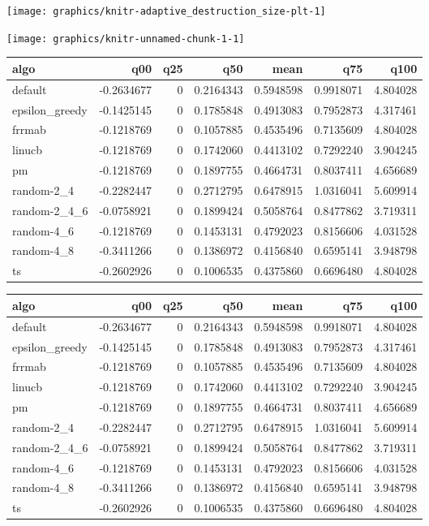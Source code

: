 \documentclass[
]{article}
\begin{document}
\begin{center}\texttt{[image: graphics/knitr-adaptive\_destruction\_size-plt-1]} \end{center}

\begin{center}\texttt{[image: graphics/knitr-unnamed-chunk-1-1]} \end{center}

\begin{longtable}[]{@{}lrrrrrr@{}}
\toprule
algo & q00 & q25 & q50 & mean & q75 & q100 \\
\midrule
\endhead
default & -0.2634677 & 0 & 0.2164343 & 0.5948598 & 0.9918071 &
4.804028 \\
epsilon\_greedy & -0.1425145 & 0 & 0.1785848 & 0.4913083 & 0.7952873 &
4.317461 \\
frrmab & -0.1218769 & 0 & 0.1057885 & 0.4535496 & 0.7135609 &
4.804028 \\
linucb & -0.1218769 & 0 & 0.1742060 & 0.4413102 & 0.7292240 &
3.904245 \\
pm & -0.1218769 & 0 & 0.1897755 & 0.4664731 & 0.8037411 & 4.656689 \\
random-2\_4 & -0.2282447 & 0 & 0.2712795 & 0.6478915 & 1.0316041 &
5.609914 \\
random-2\_4\_6 & -0.0758921 & 0 & 0.1899424 & 0.5058764 & 0.8477862 &
3.719311 \\
random-4\_6 & -0.1218769 & 0 & 0.1453131 & 0.4792023 & 0.8156606 &
4.031528 \\
random-4\_8 & -0.3411266 & 0 & 0.1386972 & 0.4156840 & 0.6595141 &
3.948798 \\
ts & -0.2602926 & 0 & 0.1006535 & 0.4375860 & 0.6696480 & 4.804028 \\
\bottomrule
\end{longtable}

\begin{longtable}[]{@{}lrrrrrr@{}}
\toprule
algo & q00 & q25 & q50 & mean & q75 & q100 \\
\midrule
\endhead
default & -0.2634677 & 0 & 0.2164343 & 0.5948598 & 0.9918071 &
4.804028 \\
epsilon\_greedy & -0.1425145 & 0 & 0.1785848 & 0.4913083 & 0.7952873 &
4.317461 \\
frrmab & -0.1218769 & 0 & 0.1057885 & 0.4535496 & 0.7135609 &
4.804028 \\
linucb & -0.1218769 & 0 & 0.1742060 & 0.4413102 & 0.7292240 &
3.904245 \\
pm & -0.1218769 & 0 & 0.1897755 & 0.4664731 & 0.8037411 & 4.656689 \\
random-2\_4 & -0.2282447 & 0 & 0.2712795 & 0.6478915 & 1.0316041 &
5.609914 \\
random-2\_4\_6 & -0.0758921 & 0 & 0.1899424 & 0.5058764 & 0.8477862 &
3.719311 \\
random-4\_6 & -0.1218769 & 0 & 0.1453131 & 0.4792023 & 0.8156606 &
4.031528 \\
random-4\_8 & -0.3411266 & 0 & 0.1386972 & 0.4156840 & 0.6595141 &
3.948798 \\
ts & -0.2602926 & 0 & 0.1006535 & 0.4375860 & 0.6696480 & 4.804028 \\
\bottomrule
\end{longtable}
\end{document}

